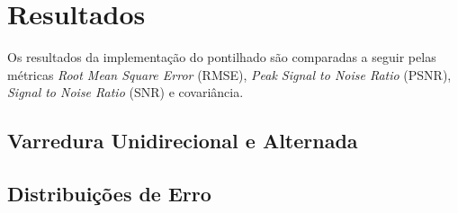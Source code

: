 \section{Resultados}

Os resultados da implementação do pontilhado são comparadas a seguir pelas métricas \textit{Root Mean Square Error} (RMSE), \textit{Peak Signal to Noise Ratio} (PSNR), \textit{Signal to Noise Ratio} (SNR) e covariância.

\subsection{Varredura Unidirecional e Alternada}
    {}

\subsection{Distribuições de Erro}
    
